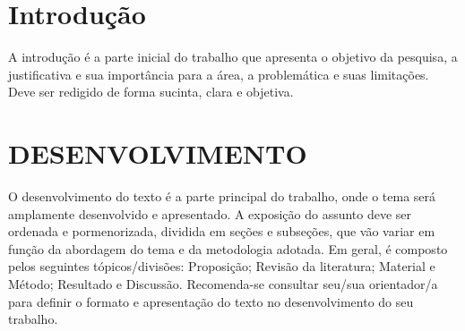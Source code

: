 \documentclass[
  12pt,		%
  a4paper,	%
  openright,  %
  oneside,	%
  chapter=TITLE,		%
  section=TITLE,		%
  english,	%
  french,	    %
  spanish,	%
  brazil	    %
]{abntex2}
\begin{document}
    
    \tableofcontents*
    \newpage
    
    
    \textual
    \pagestyle{simple} 
    
    
    \chapter{Introdução} %
    
    A introdução é a parte inicial do trabalho que apresenta o objetivo da pesquisa, a justificativa e sua importância para a área, a problemática e suas limitações. Deve ser redigido de forma sucinta, clara e objetiva. 
       
    
    \chapter{DESENVOLVIMENTO} %
    
        
        O desenvolvimento do texto é a parte principal do trabalho, onde o tema será amplamente desenvolvido e apresentado. A exposição do assunto deve ser ordenada e pormenorizada, dividida em seções e subseções, que vão variar em função da abordagem do tema e da metodologia adotada. Em geral, é composto pelos seguintes tópicos/divisões: Proposição; Revisão da literatura; Material e Método; Resultado e Discussão. Recomenda-se consultar seu/sua orientador/a para definir o formato e apresentação do texto no desenvolvimento do seu trabalho.
                
\end{document}
